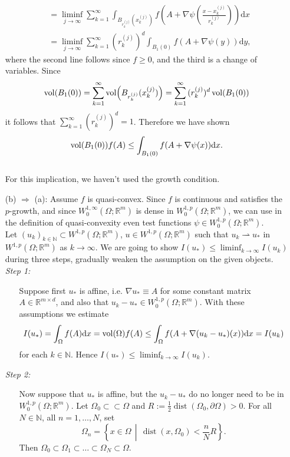 \begin{itemize}
\begin{align*}
		&=\liminf_{j\to\infty}{\sum_{k=1}^\infty{\int_{B_{r_k^{(j)}}(x_k^{(j)})}{f(A+\nabla\psi\left(\frac{x-x_k^{(j)}}{r_k^{(j)}}\right))\mathrm{d}x}}}\\
		&=\liminf_{j\to\infty}{\sum_{k=1}^\infty{(r_k^{(j)})^d\int_{B_1(0)}{f(A+\nabla\psi(y))\mathrm{d}y}}},
	\end{align*}
	where the second line follows since $f\geq0$, and the third is a change of variables. Since
	\[\operatorname{vol}\mathopen{}\left(B_1(0)\right)\mathclose{}=\sum_{k=1}^\infty{\operatorname{vol}\mathopen{}\left(B_{r_k^{(j)}}(x_k^{(j)})\right)\mathclose{}}=\sum_{k=1}^\infty{(r_k^{(j)})^d\operatorname{vol}\mathopen{}\left(B_1(0)\right)\mathclose{}}\]
	it follows that $\sum_{k=1}^\infty{(r_k^{(j)})^d}=1$. Therefore we have shown
	\[\operatorname{vol}\mathopen{}\left(B_1(0)\right)\mathclose{}f(A)\leq\int_{B_1(0)}{f(A+\nabla\psi(x))\mathrm{d}x}.\]\\

	For this implication, we haven't used the growth condition.
	\item[(b)] $\Rightarrow$ (a): Assume $f$ is quasi-convex. Since $f$ is continuous and satisfies the $p$-growth, and since $W_0^{1,\infty}(\Omega;\mathbb{R}^m)$ is dense in $W_0^{1,p}(\Omega;\mathbb{R}^m)$, we can use in the definition of quasi-convexity even test functions $\psi\in W_0^{1,p}(\Omega;\mathbb{R}^m)$.\\

	Let $(u_k)_{k\in\mathbb{N}}\subset W^{1,p}(\Omega;\mathbb{R}^m)$, $u\in W^{1,p}(\Omega;\mathbb{R}^m)$ such that $u_k\rightharpoonup u_*$ in $W^{1,p}(\Omega;\mathbb{R}^m)$ as $k\to\infty$. We are going to show $I(u_*)\leq\liminf_{k\to\infty}{I(u_k)}$ during three steps, gradually weaken the assumption on the given objects.\\

	\textit{Step 1:}
	\begin{itemize}
		\item[] Suppose first $u_*$ is affine, i.e. $\nabla u_*\equiv A$ for some constant matrix $A\in\mathbb{R}^{m\times d}$, and also that $u_k-u_*\in W_0^{1,p}(\Omega;\mathbb{R}^m)$. With these assumptions we estimate
		\[I(u_*)=\int_\Omega{f(A)\mathrm{d}x}=\operatorname{vol}\mathopen{}\left(\Omega\right)\mathclose{}f(A)\leq\int_\Omega{f(A+\nabla(u_k-u_*)(x))\mathrm{d}x}=I(u_k)\]
		for each $k\in\mathbb{N}$. Hence $I(u_*)\leq\liminf_{k\to\infty}{I(u_k)}$.\\
	\end{itemize}

	\textit{Step 2:}
	\begin{itemize}
		\item[] Now suppose that $u_*$ is affine, but the $u_k-u_*$ do no longer need to be in $W_0^{1,p}(\Omega;\mathbb{R}^m)$. Let $\Omega_0\subset\mathrel\subset\Omega$ and $R:=\frac{1}{2}\operatorname{dist}(\Omega_0,\partial\Omega)>0$. For all $N\in\mathbb{N}$, all $n=1,\dotsc,N$, set
		\[\Omega_n=\left\{x\in\Omega\,\middle\vert\,\operatorname{dist}(x,\Omega_0)<\frac{n}{N}R\right\}.\]
		Then $\Omega_0\subset\Omega_1\subset\dotsc\subset\Omega_N\subset\Omega$.


\end{itemize}
\end{itemize}
